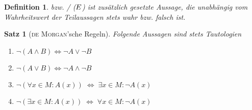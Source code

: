 \documentclass[ngerman,a4paper]{report}
\theoremstyle{break}
\newtheorem{satz}[theorem]{Satz}
\newtheorem*{definition}{Definition}
\newcommand{\person}[1]{\textsc{#1}}
\begin{document}
\begin{definition}
	 bzw. \slash{} ($\Lightning$) ist zusätzlich gesetzte Aussage, die unabhängig vom Wahrheitswert der Teilaussagen stets wahr bzw. falsch ist.
\end{definition}

\begin{satz}[\person{de Morgan}'sche Regeln]
	Folgende Aussagen sind stets Tautologien
	\begin{enumerate}[label={\alph*)}]
		\item $\neg(A\land B) \Leftrightarrow \neg A \lor \neg B$
		\item $\neg(A\lor B) \Leftrightarrow \neg A\land \neg B$
		\item $\neg (\forall x\in M: A(x)) \;\Leftrightarrow \; \exists x\in M:\neg A(x)$
		\item $\neg (\exists x\in M: A(x)) \;\Leftrightarrow \;\forall x\in M:\neg A(x)$
	\end{enumerate}
\end{satz}
\end{document}
